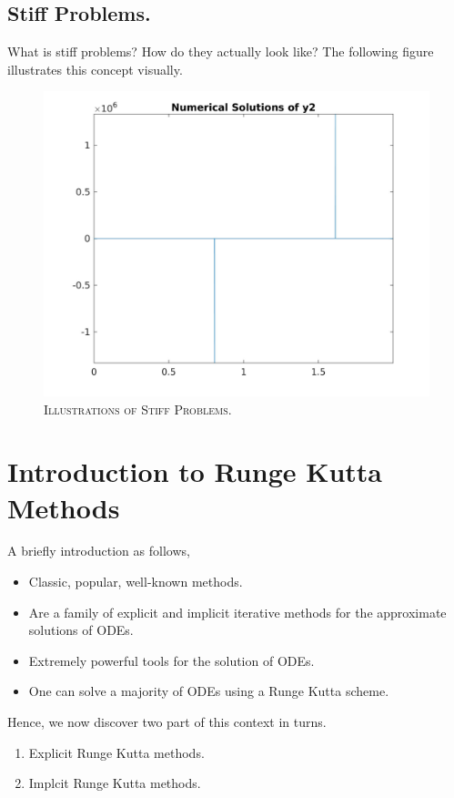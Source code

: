 \documentclass[a4paper,oneside]{book}
\numberwithin{equation}{chapter}
\begin{document}
\subsection{Stiff Problems.}
What is stiff problems? How do they actually look like? The following figure illustrates this concept visually.
\begin{figure}[H]
\centering 
\includegraphics[scale=0.25]{fts_vdp_y2_1e-7_nl}
\caption{\textsc{Illustrations of Stiff Problems.}}
\end{figure}
\section{Introduction to Runge Kutta Methods}
A briefly introduction as follows,
\begin{itemize}
\item Classic, popular, well-known methods.
\item Are a family of explicit and implicit iterative methods for the approximate solutions of ODEs.
\item Extremely powerful tools for the solution of ODEs.
\item One can solve a majority of ODEs using a Runge Kutta scheme.
\end{itemize}
Hence, we now discover two part of this context in turns.
\begin{enumerate}
\item Explicit Runge Kutta methods. 
\item Implcit Runge Kutta methods.
\end{enumerate}
\end{document}
